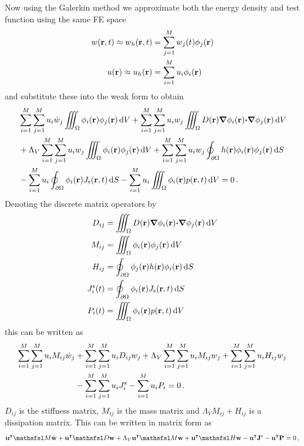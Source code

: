 \documentclass[a4paper]{article}
\numberwithin{equation}{section}
\providecommand\oiint{\oint}
\begin{document}
Now using the Galerkin method we approximate both the energy density and test function using
the same FE space
\begin{align}
w(\boldsymbol{\mathrm{r}},t) \approx w_h(\boldsymbol{\mathrm{r}},t) &= \sum_{j=1}^M w_j(t)\phi_j(\boldsymbol{\mathrm{r}}) \\
u(\boldsymbol{\mathrm{r}}) \approx u_h(\boldsymbol{\mathrm{r}}) &= \sum_{i=1}^M u_i\phi_i(\boldsymbol{\mathrm{r}})
\end{align}
and substitute these into the weak form to obtain
\begin{align}
&\sum_{i=1}^M\sum_{j=1}^M u_i \dot{w}_j \iiint_{\Omega} \phi_i\pr\phi_j\pr\dif{V}
+\sum_{i=1}^M\sum_{j=1}^M u_i w_j \iiint_{\Omega} D\pr\vnabla\phi_i\pr{\vcdot}{\vnabla}\phi_j\pr\dif{V} \nonumber \\
&+\Lambda_V\sum_{i=1}^M\sum_{j=1}^M u_i w_j \iiint_{\Omega} \phi_i\pr\phi_j\pr\dif{V} 
+\sum_{i=1}^M\sum_{j=1}^M u_i w_j \oiint_{\partial\Omega} h\pr\phi_i\pr\phi_j\pr\dif{S} \nonumber \\
&-\sum_{i=1}^M u_i \oiint_{\partial\Omega} \phi_i\pr J_\rs\prt\dif{S}
-\sum_{i=1}^M u_i\iiint_{\Omega} \phi_i\pr p\prt\dif{V}
= 0\,.
\end{align}
Denoting the discrete matrix operators by
\begin{align}
D_{ij} &= \iiint_{\Omega} D\pr{\vnabla}\phi_i\pr{\vcdot}{\vnabla}\phi_j\pr\dif{V} \\
M_{ij} &= \iiint_{\Omega} \phi_i\pr\phi_j\pr\dif{V} \\
H_{ij} &= \oiint_{\partial\Omega} \phi_j\pr h\pr \phi_i\pr\dif{S} \\
J_i^\rs(t) &= \oiint_{\partial\Omega} \phi_i\pr J_\rs\prt\dif{S} \\
P_i(t) &= \iiint_{\Omega} \phi_i\pr p\prt \dif{V}
\end{align}
this can be written as
\begin{align}
\sum_{i=1}^M\sum_{j=1}^M u_i M_{ij} \dot{w}_j 
&+\sum_{i=1}^M\sum_{j=1}^M u_i D_{ij} w_j 
+\Lambda_V\sum_{i=1}^M\sum_{j=1}^M u_i M_{ij} w_j 
+\sum_{i=1}^M\sum_{j=1}^M u_i H_{ij} w_j \nonumber \\
&-\sum_{i=1}^M\sum_{j=1}^M u_i J^{\mathrm{s}}_i
-\sum_{i=1}^M u_i P_i
= 0\,.
\end{align}
$D_{ij}$ is the stiffness matrix, $M_{ij}$ is the mass
matrix and $\Lambda_V M_{ij}+H_{ij}$ is a dissipation matrix. This can be written in matrix form as
\begin{align}
\vec{u}^\intercal \mM \dot{\vec{w}} + \vec{u}^\intercal\mD \vec{w} +\Lambda_V \vec{u}^\intercal\mM \vec{w}+ \vec{u}^\intercal\mH \vec{w}
-\vec{u}^\intercal\vec{J}^\rs -\vec{u}^\intercal\vec{P} = 0\,,
\end{align}
\end{document}
